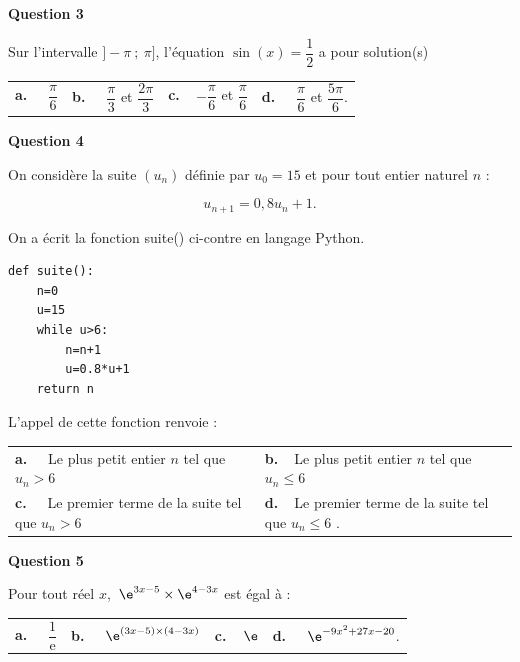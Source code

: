 \medskip
\textbf{Question 3}
\medskip 

Sur l'intervalle $] -\pi~;~\pi]$, l'équation $\sin(x) = \dfrac{1}{2}$
a pour solution(s)

\medskip
\begin{tabularx}{\linewidth}{*{4}{X}}
\textbf{a.~~} $\dfrac{\pi}{6} $ &\textbf{b.~~} $\dfrac{\pi}{3}$ et $\dfrac{2\pi}{3} $&\textbf{c.~~}$-\dfrac{\pi}{6}$ et $\dfrac{\pi}{6} $& \textbf{d.~~} $\dfrac{\pi}{6}$ et $\dfrac{5\pi}{6} $.
\end{tabularx}

\medskip

\textbf{Question 4}

\medskip 

On considère la suite $\left(u_n\right)$ définie par $u_0 = 15$ et pour tout entier naturel $n$ :

\[u_{n+1} = 0,8 u_n + 1.\]

On a écrit la fonction suite() ci-contre en langage Python.

\begin{lstlisting}[style=python]
def suite():
	n=0
	u=15
	while u>6:
		n=n+1
		u=0.8*u+1
	return n
\end{lstlisting}

L'appel de cette fonction renvoie :

\medskip

\begin{tabularx}{\linewidth}{*{2}{X}}
\textbf{a.~~} Le plus petit entier $n$ tel que $u_n > 6$ &\textbf{b.~~}Le plus petit entier $n$ tel que $u_n \leqslant 6$ \\\textbf{c.~~} Le premier terme de la suite tel que $u_n > 6$ & \textbf{d.~~}Le premier terme de la suite tel que $u_n \leqslant 6$ .
\end{tabularx}

\medskip

\textbf{Question 5}

\medskip 

Pour tout réel $x$,\, $\e^{3x-5} \times \e^{4 - 3x}$ est égal à :

\begin{tabularx}{\linewidth}{*{4}{X}}
\textbf{a.~~} $\dfrac{1}{\text{e}}$ &\textbf{b.~~} $ \e^{(3x-5)\times(4-3x)}$&\textbf{c.~~}$ \e $& \textbf{d.~~} $\e^{-9x^2+27x-20} $.
\end{tabularx}

\vspace{0,5cm}
